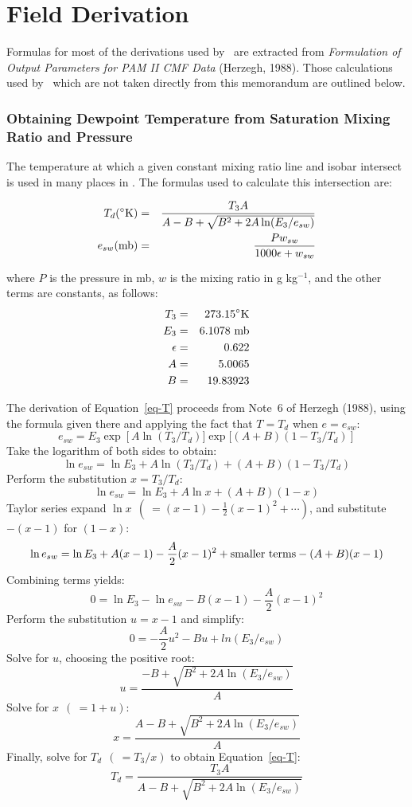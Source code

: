 


\appendix

\part{Field Derivation}

Formulas for most of the derivations used by \suds\ are extracted from {\sl
Formulation of Output Parameters for PAM II CMF Data} (Herzegh, 1988).  Those
calculations used by \suds\ which are not taken directly from this memorandum
are outlined below.

\section{Obtaining Dewpoint Temperature from Saturation Mixing 
	Ratio and Pressure}

The temperature at which a given constant mixing ratio line and isobar 
intersect is used in many places in \suds.  The formulas used to calculate
this intersection are:

\begin{eqnarray}
	T_d (^\circ{\rm K}) &=& \frac{T_3 A}
		{A - B + \sqrt{B^2 + 2A \ln(E_3/e_{sw})}} \label{eq-T}\\
	e_{sw} ({\rm mb}) &=& \frac{Pw_{sw}}{1000\epsilon + w_{sw}}\label{eq-e}
\end{eqnarray}

where $P$ is the pressure in mb, $w$ is the mixing ratio in g kg$^{-1}$, and
the other terms are constants, as follows:
\begin{eqnarray*}
	T_3 &=& 273.15 ^\circ{\rm K} \\
	E_3 &=& 6.1078 {\rm~mb} \\
	\epsilon &=& 0.622 \\
	A &=& 5.0065 \\
	B &=& 19.83923
\end{eqnarray*}

The derivation of Equation~\ref{eq-T} proceeds from Note~6 of Herzegh (1988),
using the formula given there and applying the fact that $T = T_d$ when 
$e = e_{sw}$:
\[
	e_{sw} = E_3 \exp\left[A \ln(T_3 / T_d)] 
		\exp[(A + B)(1 - T_3 / T_d)\right]
\]
Take the logarithm of both sides to obtain:
\[
	\ln e_{sw} = \ln E_3 + A \ln(T_3 / T_d) + (A + B)(1 - T_3 / T_d)
\]
Perform the substitution $x = T_3 / T_d$:
\[
	\ln e_{sw} = \ln E_3 + A \ln x + (A + B)(1 - x)
\]
Taylor series expand $\ln x~~(~= (x-1) - \frac{1}{2}(x-1)^2 + \cdots)$, and
substitute $-(x-1)$ for $(1-x)$:
\[
	\ln e_{sw} = \ln E_3 + A(x-1) - \frac{A}{2}(x-1)^2 + 
		{\rm smaller~terms} - (A+B)(x-1)
\]
Combining terms yields:
\[
	0 = \ln E_3 - \ln e_{sw} - B(x-1) - \frac{A}{2}(x-1)^2
\]
Perform the substitution $u = x - 1$ and simplify:
\[
	0 = -\frac{A}{2}u^2 - Bu + ln (E_3 / e_{sw})
\]
Solve for $u$, choosing the positive root:
\[
	u = \frac{-B + \sqrt{B^2 + 2A \ln (E_3 / e_{sw})}}{A}
\]
Solve for $x~~(~= 1 + u)$:
\[
	x = \frac{A - B + \sqrt{B^2 + 2A \ln (E_3 / e_{sw})}}{A}
\]
Finally, solve for $T_d~~(~= T_3 / x)$ to obtain Equation~\ref{eq-T}:
\[
	T_d = \frac{T_3 A}{A - B + \sqrt{B^2 + 2A \ln (E_3 / e_{sw})}}
\]

